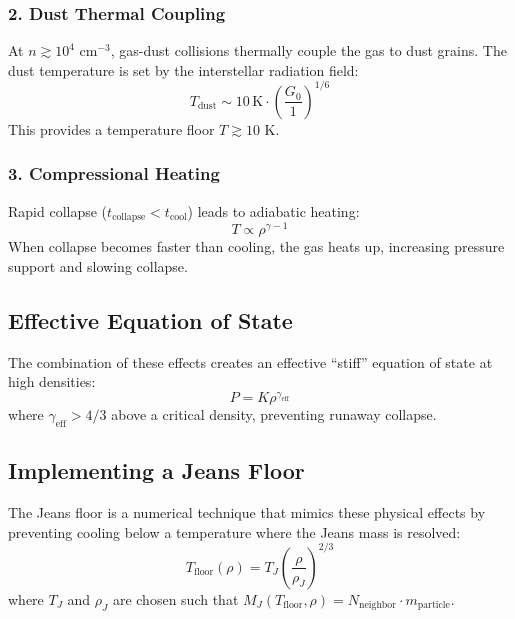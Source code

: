\documentclass[12pt,a4paper]{article}
\begin{document}
\subsubsection{2. Dust Thermal Coupling}

At $n \gtrsim 10^4$ cm$^{-3}$, gas-dust collisions thermally couple the gas to
dust grains. The dust temperature is set by the interstellar radiation field:
\begin{equation}
    T_{\text{dust}} \sim 10 \, \text{K} \cdot \left(\frac{G_0}{1}\right)^{1/6}
\end{equation}
This provides a temperature floor $T \gtrsim 10$ K.

\subsubsection{3. Compressional Heating}

Rapid collapse ($t_{\text{collapse}} < t_{\text{cool}}$) leads to adiabatic heating:
\begin{equation}
    T \propto \rho^{\gamma - 1}
\end{equation}
When collapse becomes faster than cooling, the gas heats up, increasing pressure
support and slowing collapse.

\subsection{Effective Equation of State}

The combination of these effects creates an effective ``stiff'' equation of state
at high densities:
\begin{equation}
    P = K \rho^{\gamma_{\text{eff}}}
\end{equation}
where $\gamma_{\text{eff}} > 4/3$ above a critical density, preventing runaway
collapse.

\subsection{Implementing a Jeans Floor}

The Jeans floor is a numerical technique that mimics these physical effects by
preventing cooling below a temperature where the Jeans mass is resolved:
\begin{equation}
    T_{\text{floor}}(\rho) = T_J \left(\frac{\rho}{\rho_J}\right)^{2/3}
\end{equation}
where $T_J$ and $\rho_J$ are chosen such that $M_J(T_{\text{floor}}, \rho) =
N_{\text{neighbor}} \cdot m_{\text{particle}}$.
\end{document}
